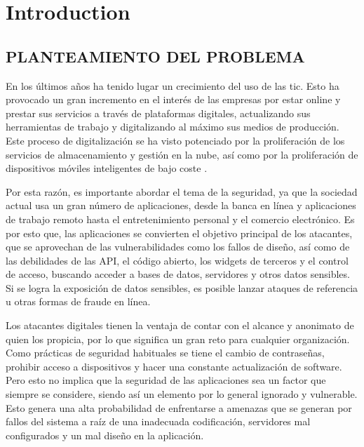 \setcounter{page}{1}

\chapter{Introduction}
\label{chap1:introduction}

\begin{center}
    \item \section{PLANTEAMIENTO DEL PROBLEMA}
\end{center}


\justify %

\vfill %


En los últimos años ha tenido lugar un crecimiento del uso de las \gls{tic}. Esto ha provocado un gran incremento en el interés de las empresas por estar online y prestar sus servicios a través de plataformas digitales, actualizando sus herramientas de trabajo y digitalizando al máximo sus medios de producción. Este proceso de digitalización se ha visto potenciado por la proliferación de los servicios de almacenamiento y gestión en la nube, así como por la proliferación de dispositivos móviles inteligentes de bajo coste \cite{PedroRuiz}. 

Por esta razón, es importante abordar el tema de la seguridad, ya que la sociedad actual usa un gran número de aplicaciones, desde la banca en línea y aplicaciones de trabajo remoto hasta el entretenimiento personal y el comercio electrónico. Es por esto que, las aplicaciones se convierten el objetivo principal de los atacantes, que se aprovechan de las vulnerabilidades como los fallos de diseño, así como de las debilidades de las API, el código abierto, los widgets de terceros y el control de acceso, buscando acceder a bases de datos, servidores y otros datos sensibles. Si se logra la exposición de datos sensibles, es posible lanzar ataques de referencia u otras formas de fraude en línea.

Los atacantes digitales tienen la ventaja de contar con el  alcance y anonimato de quien los propicia, por lo que significa un gran reto para cualquier organización. Como prácticas de seguridad habituales se tiene el cambio de contraseñas, prohibir acceso a dispositivos y hacer una constante actualización de software. Pero esto no implica que la seguridad de las aplicaciones sea un factor que siempre se considere, siendo así un elemento por lo general ignorado y vulnerable. Esto genera una alta probabilidad de enfrentarse a amenazas que se generan por fallos del sistema a raíz de una inadecuada codificación, servidores mal configurados y un mal diseño en la aplicación.



